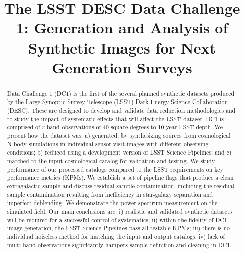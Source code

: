 \documentclass[\docopts]{\docclass}
\begin{document}
\title[LSST DESC DC1]{The LSST DESC Data Challenge 1: Generation and Analysis of Synthetic Images for Next Generation Surveys }
%
\maketitlepre

\begin{abstract}
  Data Challenge 1 (DC1) is the first of the several planned synthetic
  datasets produced by the Large Synoptic Survey Telescope (LSST)
  Dark Energy Science Collaboration (DESC). These are designed to
  develop and validate data reduction methodologies
  and to study the impact of systematic effects that
  will affect the LSST dataset. DC1 is comprised of $r$-band
  observations of 40 square degrees to 10 year LSST depth. We present
  how the dataset was: a) generated, by synthesizing sources from cosmological
  N-body simulations in individual sensor-visit images with different observing conditions; b)
  reduced using a development version of
  LSST Science Pipelines; and c) matched to the input cosmological catalog for validation and testing. We
  study performance of our processed catalogs compared to the
  LSST requirements on key performance metrics (KPMs). We establish a
  set of pipeline flags that produce a clean extragalactic sample and
  discuss residual sample contamination, including the residual sample contamination
  resulting from inefficiency in star-galaxy separation and imperfect deblending. We demonstrate the
  power spectrum measurement on the simulated field. Our main
  conclusions are: i) realistic and validated synthetic datasets will
  be required for a successful control of systematics; ii) within the fidelity of DC1
  image generation, the LSST Science Pipelines pass all testable KPMs;
   iii) there is no individual noiseless method for matching the input and output
  catalogs; iv) lack of multi-band observations significantly hampers
  sample definition and cleaning in DC1.

  



\end{abstract}
\end{document}
